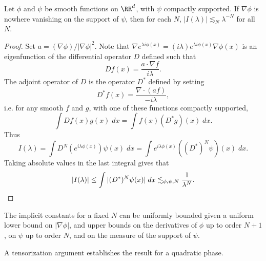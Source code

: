 \begin{theorem}
  Let $\phi$ and $\psi$ be smooth functions on $\RR^d$, with $\psi$ compactly supported. If $\nabla \phi$ is nowhere vanishing on the support of $\psi$, then for each $N$, $|I(\lambda)| \lesssim_N \lambda^{-N}$ for all $N$.
\end{theorem}

\begin{proof}
    Set $a = (\nabla \phi)/|\nabla \phi|^2$. Note that $\nabla e^{\lambda i \phi(x)} = (i\lambda) e^{\lambda i \phi(x)} \nabla \phi(x)$ is an eigenfunction of the differential operator $D$ defined such that
    \[ Df(x) = \frac{a \cdot \nabla f}{i \lambda}. \]
    The adjoint operator of $D$ is the operator $D^*$ defined by setting
    \[ D^*f(x) = \frac{\nabla \cdot (af)}{-i\lambda}, \]
    i.e. for any smooth $f$ and $g$, with one of these functions compactly supported,
    \[ \int Df(x) g(x)\; dx = \int f(x) (D^*g)(x)\; dx. \]
    Thus
    \[ I(\lambda) = \int D^N(e^{i \lambda \phi(x)}) \psi(x)\; dx = \int e^{i \lambda \phi(x)} ((D^*)^N\psi)(x)\; dx. \]
    Taking absolute values in the last integral gives that
    \[ |I(\lambda)| \leq \int |(D^*)^N \psi(x)|\; dx \lesssim_{\phi,\psi,N} \frac{1}{\lambda^N}. \qedhere \]
\end{proof}

\begin{remark}
  The implicit constants for a fixed $N$ can be uniformly bounded given a uniform lower bound on $|\nabla \phi|$, and upper bounds on the derivatives of $\phi$ up to order $N+1$, on $\psi$ up to order $N$, and on the measure of the support of $\psi$.
\end{remark}

A tensorization argument establishes the result for a quadratic phase.

